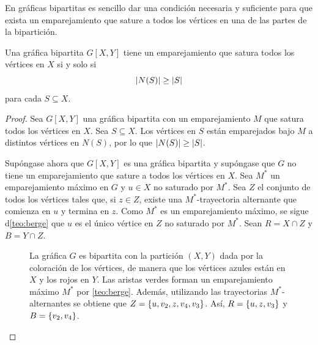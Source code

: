 En gr\'aficas bipartitas es sencillo dar una condici\'on necesaria y suficiente
para que exista un emparejamiento que sature a todos los v\'ertices en una de
las partes de la bipartici\'on.

\begin{teorema}
\label{teo:hall}
  Una gr\'afica bipartita $G[X,Y]$ tiene un emparejamiento que satura todos los
  v\'ertices en $X$ si y solo si
  \[
      \left|N(S)\right|\ge \left|S\right|
  \]
  para cada $S\subseteq X$.
\end{teorema}

\begin{proof}
  Sea $G[X,Y]$ una gr\'afica bipartita con un emparejamiento $M$ que satura
  todos los v\'ertices en $X$. Sea $S\subseteq X$. Los v\'ertices en $S$ est\'an
  emparejados bajo $M$ a distintos v\'ertices en $N(S)$, por lo que
  $\left|N(S)\right|\ge \left|S\right|$.

  Sup\'ongase ahora que $G[X,Y]$ es una gr\'afica bipartita y sup\'ongase que
  $G$ no tiene un emparejamiento que sature a todos los v\'ertices en $X$. Sea
  $M^*$ un emparejamiento m\'aximo en $G$ y $u\in X$ no saturado por $M^*$. Sea
  $Z$ el conjunto de todos los v\'ertices tales que, si $z\in Z$, existe una
  $M^*$-trayectoria alternante que comienza en $u$ y termina en $z$. Como $M^*$
  es un emparejamiento m\'aximo, se sigue d\cref{teo:berge} que $u$ es el
  \'unico v\'ertice en $Z$ no saturado por $M^*$. Sean $R=X\cap Z$ y $B=Y\cap
  Z$.

  \begin{figure}[ht!]
    \centering
    \captionsetup{font=footnotesize}
    \caption{La gr\'afica $G$ es bipartita con la partici\'on $(X,Y)$ dada por
    la coloraci\'on de los v\'ertices, de manera que los v\'ertices azules
    est\'an en $X$ y los rojos en $Y$. Las aristas verdes forman un
    emparejamiento m\'aximo $M^*$ por \cref{teo:berge}. Adem\'as, utilizando las
    trayectorias $M^*$-alternantes se obtiene que $Z=\left\{ u,v_2,z,v_4,v_3\right\}$.
    As\'i, $R=\left\{ u,z,v_3\right\}$ y $B=\left\{ v_2,v_4\right\}$.}
    \label{fig:grafica-dibujo6}
  \end{figure}


\end{proof}
